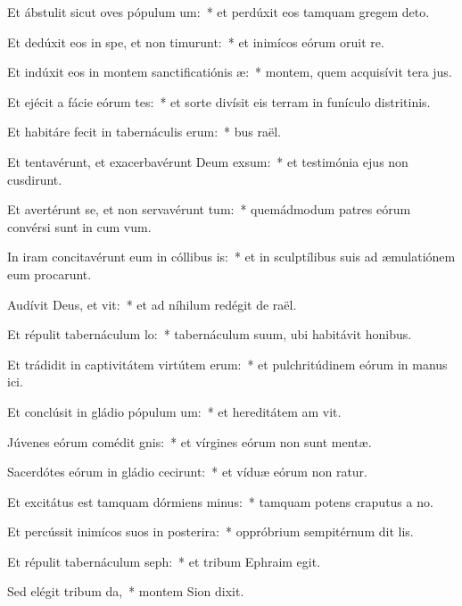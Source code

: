 \item Et ábstulit sicut oves pópulum um:~* et perdúxit eos tamquam gregem  deto.
\item Et dedúxit eos in spe, et non timurunt:~* et inimícos eórum oruit re.
\item Et indúxit eos in montem sanctificatiónis æ:~* montem, quem acquisívit tera jus.
\item Et ejécit a fácie eórum tes:~* et sorte divísit eis terram in funículo distritinis.
\item Et habitáre fecit in tabernáculis erum:~* bus raël.
\item Et tentavérunt, et exacerbavérunt Deum exsum:~* et testimónia ejus non cusdirunt.
\item Et avertérunt se, et non servavérunt tum:~* quemádmodum patres eórum convérsi sunt in cum vum.
\item In iram concitavérunt eum in cóllibus is:~* et in sculptílibus suis ad æmulatiónem eum procarunt.
\item Audívit Deus, et vit:~* et ad níhilum redégit de raël.
\item Et répulit tabernáculum lo:~* tabernáculum suum, ubi habitávit  honibus.
\item Et trádidit in captivitátem virtútem erum:~* et pulchritúdinem eórum in manus ici.
\item Et conclúsit in gládio pópulum um:~* et hereditátem am vit.
\item Júvenes eórum comédit gnis:~* et vírgines eórum non sunt mentæ.
\item Sacerdótes eórum in gládio cecirunt:~* et víduæ eórum non ratur.
\item Et excitátus est tamquam dórmiens minus:~* tamquam potens craputus a no.
\item Et percússit inimícos suos in posterira:~* oppróbrium sempitérnum dit lis.
\item Et répulit tabernáculum seph:~* et tribum Ephraim  egit.
\item Sed elégit tribum da,~* montem Sion  dixit.

